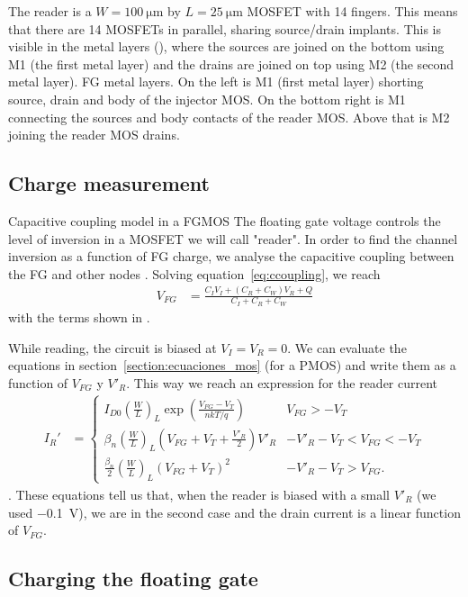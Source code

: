 {The reader is a $W=\SI{100}{\micro\meter}$ 
by $L=\SI{25}{\micro\meter}$ MOSFET with 14 fingers.
This means that there are 14 MOSFETs in parallel,
sharing source/drain implants. 
This is visible in the metal layers (),
where the sources are joined on the bottom using M1 (the first metal layer)
and the drains are joined on top using M2 (the second metal layer).
{FG metal layers.
On the left is M1 (first metal layer)
shorting source, drain and body of the injector MOS.
On the bottom right is M1 connecting the sources and body contacts of the reader MOS.
Above that is M2 joining the reader MOS drains.}
\subsection{Charge measurement}
{Capacitive coupling model in a FGMOS}
The floating gate voltage controls the level of inversion
in a MOSFET we will call "reader".
In order to find the channel inversion as a function of FG charge,
we analyse the capacitive coupling between the FG and other nodes
.
Solving equation~\ref{eq:ccoupling}, we reach
\begin{align*}
    V_{FG} &= \frac{C_I V_I + (C_R+C_W) V_R + Q}{C_I+C_R+C_W}
\end{align*}
with the terms shown in .

While reading, the circuit is biased at $V_I=V_R=0$.
We can evaluate the equations in section~\ref{section:ecuaciones_mos}
(for a PMOS) and write them as a function of $V_{FG}$ y $V'_R$.
This way we reach an expression for the reader current
\begin{align*}
    I_R' &= \begin{cases}
        I_{D0} \left(\frac W L\right)_L
        \exp\left(\frac{V_{FG}-V_T}{nkT/q}\right)& V_{FG}>-V_T\\
        \beta_n\left(\frac W L\right)_L(V_{FG}+V_T+\frac{V'_R}2)V'_R &
        -V'_R-V_T<V_{FG}<-V_T\\
        \frac{\beta_n}2\left(\frac W L\right)_L(V_{FG}+V_T)^2 &
        -V'_R-V_T>V_{FG}.
    \end{cases}
\end{align*}
. These equations tell us that,
when the reader is biased with a small
$V'_R$ (we used \SI{-0.1}{\volt}),
we are in the second case and the drain current
is a linear function of $V_{FG}$.
\subsection{Charging the floating gate}
%
}
